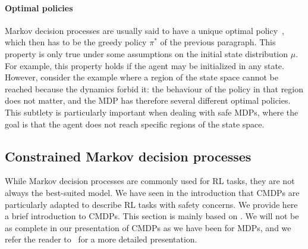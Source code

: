 			\paragraph{Optimal policies} Markov decision processes are usually said to have a unique optimal policy~\cite{sutton2018reinforcement}, which then has to be the greedy policy $\pi^*$ of the previous paragraph. This property is only true under some assumptions on the initial state distribution $\mu$. For example, this property holds if the agent may be initialized in any state. However, consider the example where a region of the state space cannot be reached because the dynamics forbid it: the behaviour of the policy in that region does not matter, and the MDP has therefore several different optimal policies. This subtlety is particularly important when dealing with safe MDPs, where the goal is that the agent does not reach specific regions of the state space.
	
		\subsection{Constrained Markov decision processes} \label{sec:cmdps preliminaries}
		While Markov decision processes are commonly used for RL tasks, they are not always the best-suited model. We have seen in the introduction that CMDPs are particularly adapted to describe RL tasks with safety concerns. We provide here a brief introduction to CMDPs. This section is mainly based on \cite[Chapter\,3]{altman1999constrained}. We will not be as complete in our presentation of CMDPs as we have been for MDPs, and we refer the reader to~\cite{altman1999constrained} for a more detailed presentation.
